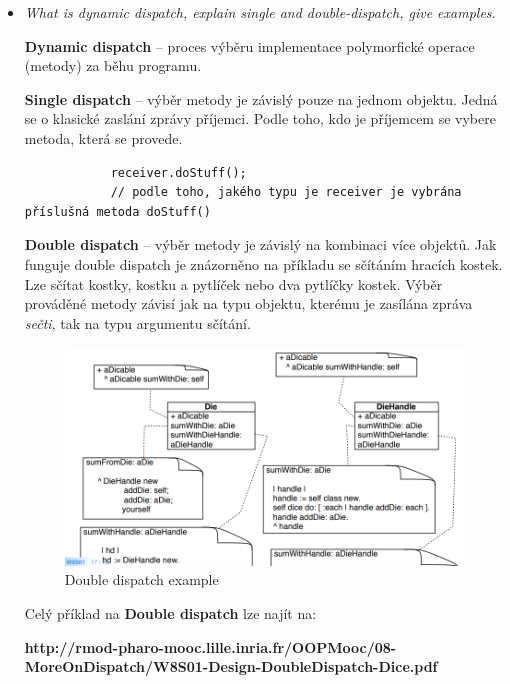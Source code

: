 \documentclass{szzclass}
\begin{document}
\begin{itemize}
      
      \item \textit{What is dynamic dispatch, explain single and double-dispatch, give examples.}
      
      \textbf{Dynamic dispatch} -- proces výběru implementace polymorfické operace (metody) za běhu programu.

      \textbf{Single dispatch} -- výběr metody je závislý pouze na jednom objektu. Jedná se o klasické
      zaslání zprávy příjemci. Podle toho, kdo je příjemcem se vybere metoda, která se provede.

      \begin{verbatim}
            receiver.doStuff();
            // podle toho, jakého typu je receiver je vybrána příslušná metoda doStuff()
      \end{verbatim}

      \textbf{Double dispatch} -- výběr metody je závislý na kombinaci více objektů. Jak funguje
      double dispatch je znázorněno na příkladu se sčítáním hracích kostek. Lze sčítat kostky,
      kostku a pytlíček nebo dva pytlíčky kostek. Výběr prováděné metody závisí jak na typu objektu,
      kterému je zasílána zpráva \textit{sečti}, tak na typu argumentu sčítání.

      \begin{figure}[h]
            \centering
            \includegraphics[width=1\textwidth]{topics/bi-wsi-si-10/double-dispatch.png}
            \caption{Double dispatch example}
      \end{figure}

      Celý příklad na \textbf{Double dispatch} lze najít na:

      \textbf{http://rmod-pharo-mooc.lille.inria.fr/OOPMooc/08-MoreOnDispatch/W8S01-Design-DoubleDispatch-Dice.pdf}


\end{itemize}
\end{document}
